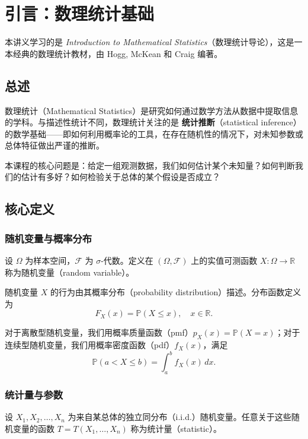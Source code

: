 \chapter*{引言：数理统计基础}\label{chap:introduction}

本讲义学习的是 \textit{Introduction to Mathematical Statistics}（数理统计导论），这是一本经典的数理统计教材，由 Hogg, McKean 和 Craig 编著。

\section{总述}

数理统计（Mathematical Statistics）是研究如何通过数学方法从数据中提取信息的学科。与描述性统计不同，数理统计关注的是 \textbf{统计推断}（statistical inference）的数学基础——即如何利用概率论的工具，在存在随机性的情况下，对未知参数或总体特征做出严谨的推断。

本课程的核心问题是：给定一组观测数据，我们如何估计某个未知量？如何判断我们的估计有多好？如何检验关于总体的某个假设是否成立？

\section{核心定义}

\subsection{随机变量与概率分布}

\begin{Definition}[随机变量]
设 $\Omega$ 为样本空间，$\mathcal{F}$ 为 $\sigma$-代数。定义在 $(\Omega, \mathcal{F})$ 上的实值可测函数 $X: \Omega \to \mathbb{R}$ 称为随机变量（random variable）。
\end{Definition}

随机变量 $X$ 的行为由其概率分布（probability distribution）描述。分布函数定义为
\[
F_X(x) = \mathbb{P}(X \leq x), \quad x \in \mathbb{R}.
\]

对于离散型随机变量，我们用概率质量函数（pmf）$p_X(x) = \mathbb{P}(X = x)$；对于连续型随机变量，我们用概率密度函数（pdf）$f_X(x)$，满足
\[
\mathbb{P}(a < X \leq b) = \int_a^b f_X(x) \, dx.
\]

\subsection{统计量与参数}

\begin{Definition}[统计量]
设 $X_1, X_2, \ldots, X_n$ 为来自某总体的独立同分布（i.i.d.）随机变量。任意关于这些随机变量的函数 $T = T(X_1, \ldots, X_n)$ 称为统计量（statistic）。
\end{Definition}

